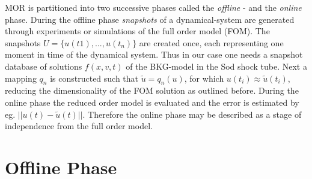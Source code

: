 MOR is partitioned into two successive phases called the \textit{offline} - and the \textit{online} phase. During the offline phase \textit{snapshots} of a dynamical-system are generated through experiments or simulations of the full order model (FOM). The snapshots \(U = \{u(t1),...,u(t_n)\}\) are created once, each representing one moment in time of the dynamical system. Thus in our case one needs a snapshot database of solutions \(f(x,v,t)\) of the BKG-model in the Sod shock tube. Next a mapping \(q_n\) is constructed such that \(\tilde{u} = q_n(u)\), for which \(u(t_i) \approx \tilde{u}(t_i)\), reducing the dimensionality of the FOM solution as outlined before. During the online phase the reduced order model is evaluated and the error is estimated by eg. \(||u(t) - \tilde{u}(t)||\). Therefore the online phase may be described as a stage of independence from the full order model. 

\section{Offline Phase}

